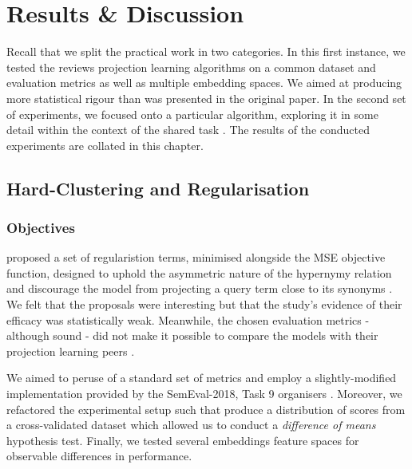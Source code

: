 \chapter{Results \& Discussion}

Recall that we split the practical work in two categories.  In this first instance, we tested the reviews projection learning algorithms on a common dataset and evaluation metrics as well as multiple embedding spaces.  We aimed at producing more statistical rigour than was presented in the original paper.  In the second set of experiments, we focused onto a particular algorithm, exploring it in some detail within the context of the shared task \citep{camacho2018semeval}.  The results of the conducted experiments are collated in this chapter.  


\section{Hard-Clustering and Regularisation}
\subsection{Objectives}
\citeauthor{ustalov2017negative} proposed a set of regularistion terms, minimised alongside the \ac{MSE} objective function, designed to uphold the asymmetric nature of the hypernymy relation and discourage the model from projecting a query term close to its synonyms \citep{ustalov2017negative}.  We felt that the proposals were interesting but that the study's evidence of their efficacy was statistically weak.  Meanwhile, the chosen evaluation metrics - although sound - did not make it possible to compare the models with their projection learning peers \citep{yamane2016distributional, bernier2018crim}.  

We aimed to peruse of a standard set of metrics and employ a slightly-modified implementation provided by the SemEval-2018, Task 9 organisers \citep{camacho2018semeval}.  Moreover, we refactored the experimental setup such that produce a distribution of scores from a cross-validated dataset which allowed us to conduct a \textit{difference of means} hypothesis test.  Finally, we tested several embeddings feature spaces for observable differences in performance.

